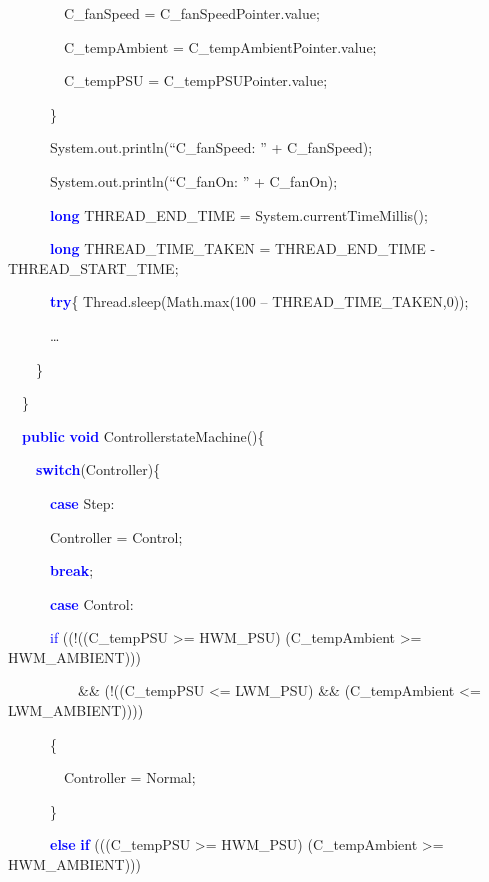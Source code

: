 \documentclass{llncs}%
\begin{document}
{\ttfamily
\ \ \ \ \ \ \ \ C\_fanSpeed = C\_fanSpeedPointer.value;}

{\ttfamily
\ \ \ \ \ \ \ \ C\_tempAmbient = C\_tempAmbientPointer.value;}

{\ttfamily
\ \ \ \ \ \ \ \ C\_tempPSU = C\_tempPSUPointer.value;}

{\ttfamily
\ \ \ \ \ \ \}}

{\ttfamily
\ \ \ \ \ \ System.out.println(``C\_fanSpeed: '' + C\_fanSpeed);}

{\ttfamily
\ \ \ \ \ \ System.out.println(``C\_fanOn: '' + C\_fanOn);}

{\ttfamily
\ \ \ \ \ \ \textbf{\textcolor{blue}{long}} THREAD\_END\_TIME =
System.currentTimeMillis();}

{\ttfamily
\ \ \ \ \ \ \textbf{\textcolor{blue}{long}} THREAD\_TIME\_TAKEN =
THREAD\_END\_TIME - THREAD\_START\_TIME;}

{\ttfamily
\ \ \ \ \ \ \textbf{\textcolor{blue}{try}}\{ Thread.sleep(Math.max(100 -- THREAD\_TIME\_TAKEN,0));}

{\ttfamily
\ \ \ \ \ \ {\dots} }

{\ttfamily
\ \ \ \ \}}

{\ttfamily
\ \ \}}


\bigskip

{\ttfamily
\ \ \textbf{\textcolor{blue}{public}} \textbf{\textcolor{blue}{void}}
ControllerstateMachine()\{}

{\ttfamily
\ \ \ \ \textbf{\textcolor{blue}{switch}}(Controller)\{}

{\ttfamily
\ \ \ \ \ \ \textbf{\textcolor{blue}{case}} Step:}

{\ttfamily
\ \ \ \ \ \ Controller = Control;}

{\ttfamily
\ \ \ \ \ \ \textbf{\textcolor{blue}{break}};}

{\ttfamily
\ \ \ \ \ \ \textbf{\textcolor{blue}{case}} Control:}

{\ttfamily
\ \ \ \ \ \ \textcolor{blue}{if} ((!((C\_tempPSU {\textgreater}=
HWM\_PSU) {\textbar}{\textbar} (C\_tempAmbient {\textgreater}=
HWM\_AMBIENT))) }

{\ttfamily
\ \ \ \ \ \ \ \ \ \ \&\& (!((C\_tempPSU {\textless}= LWM\_PSU) \&\&
(C\_tempAmbient {\textless}= LWM\_AMBIENT))))}

{\ttfamily
\ \ \ \ \ \ \{}

{\ttfamily
\ \ \ \ \ \ \ \ Controller = Normal;}

{\ttfamily
\ \ \ \ \ \ \}}

{\ttfamily
\ \ \ \ \ \ \textbf{\textcolor{blue}{else}}
\textbf{\textcolor{blue}{if}} (((C\_tempPSU {\textgreater}= HWM\_PSU)
{\textbar}{\textbar} (C\_tempAmbient {\textgreater}= HWM\_AMBIENT)))}
\end{document}
